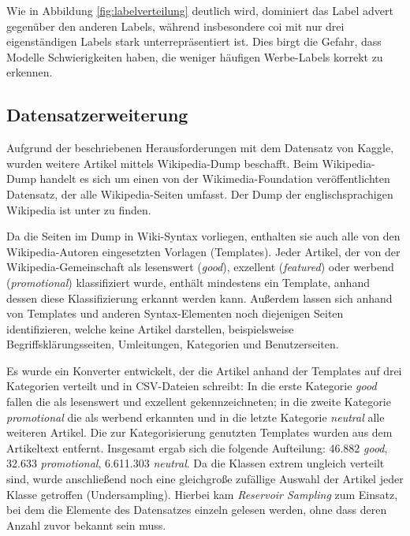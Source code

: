  Wie in Abbildung \ref{fig:labelverteilung} deutlich wird, dominiert das Label advert gegenüber den anderen Labels, während insbesondere coi mit nur drei eigenständigen Labels stark unterrepräsentiert ist. Dies birgt die Gefahr, dass Modelle Schwierigkeiten haben, die weniger häufigen Werbe-Labels korrekt zu erkennen.
\subsection{Datensatzerweiterung}
\label{ProblemeDatensatz}
\label{WPDump}
Aufgrund der beschriebenen Herausforderungen mit dem Datensatz von Kaggle, wurden weitere Artikel mittels Wikipedia-Dump beschafft. Beim Wikipedia-Dump handelt es sich um einen von der Wikimedia-Foundation veröffentlichten Datensatz, der alle Wikipedia-Seiten umfasst. Der Dump der englischsprachigen Wikipedia ist unter \cite{WpDump2024} zu finden.

Da die Seiten im Dump in Wiki-Syntax vorliegen, enthalten sie auch alle von den Wikipedia-Autoren eingesetzten Vorlagen (Templates). Jeder Artikel, der von der Wiki\-pedia-Gemeinschaft als lesenswert (\emph{good}), exzellent (\emph{featured}) oder werbend (\emph{promotional}) klassifiziert wurde, enthält mindestens ein Template, anhand dessen diese Klassifizierung erkannt werden kann. Außerdem lassen sich anhand von Templates und anderen Syntax-Elementen noch diejenigen Seiten identifizieren, welche keine Artikel darstellen, beispielsweise Begriffsklärungsseiten, Umleitungen, Kategorien und Benutzerseiten.

Es wurde ein Konverter entwickelt, der die Artikel anhand der Templates auf drei Kategorien verteilt und in CSV-Dateien schreibt: In die erste Kategorie \emph{good} fallen die als lesenswert und exzellent gekennzeichneten; in die zweite Kategorie \emph{promotional} die als werbend erkannten und in die letzte Kategorie \emph{neutral} alle weiteren Artikel. Die zur Kategorisierung genutzten Templates wurden aus dem Artikeltext entfernt. Insgesamt ergab sich die folgende Aufteilung: 46.882 \emph{good}, 32.633 \emph{promotional}, 6.611.303 \emph{neutral}. Da die Klassen extrem ungleich verteilt sind, wurde anschließend noch eine gleichgroße zufällige Auswahl der Artikel jeder Klasse getroffen (Undersampling). Hierbei kam \textit{Reservoir Sampling} \cite{Vitter1985} zum Einsatz, bei dem die Elemente des Datensatzes einzeln gelesen werden, ohne dass deren Anzahl zuvor bekannt sein muss. 

